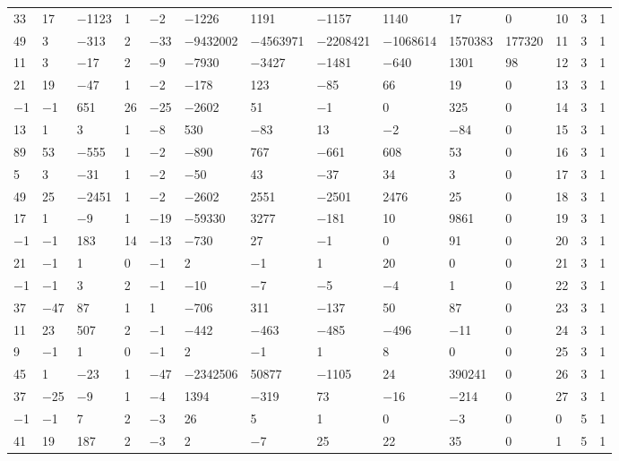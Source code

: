 \documentclass[pdftex]{sigma}
\numberwithin{equation}{section}
\theoremstyle{definition}
\numberwithin{table}{section}
\begin{document}
{\begin{paracol}{3}
\begin{supertabular}{|w{c}{.32cm}w{c}{.32cm}w{c}{.32cm}@{\hspace{.5cm}}w{c}{.2cm}w{c}{.2cm}|@{\hspace{\tabcolsep}}HHHHHHw{c}{.17cm}w{c}{.17cm}w{c}{.17cm}|}
			33 & 17 & $-$1123 & 1 & $-$2 & $-$1226 & 1191 & $-$1157 & 1140 & 17 & 0 & 10 & 3 & 1 \\
			49 & 3 & $-$313 & 2 & $-$33 & $-$9432002 & $-$4563971 & $-$2208421 & $-$1068614 & 1570383 & 177320 & 11 & 3 & 1 \\
			11 & 3 & $-$17 & 2 & $-$9 & $-$7930 & $-$3427 & $-$1481 & $-$640 & 1301 & 98 & 12 & 3 & 1 \\
			21 & 19 & $-$47 & 1 & $-$2 & $-$178 & 123 & $-$85 & 66 & 19 & 0 & 13 & 3 & 1 \\
			$-$1 & $-$1 & 651 & 26 & $-$25 & $-$2602 & 51 & $-$1 & 0 & 325 & 0 & 14 & 3 & 1 \\
			13 & 1 & 3 & 1 & $-$8 & 530 & $-$83 & 13 & $-$2 & $-$84 & 0 & 15 & 3 & 1 \\
			89 & 53 & $-$555 & 1 & $-$2 & $-$890 & 767 & $-$661 & 608 & 53 & 0 & 16 & 3 & 1 \\
			5 & 3 & $-$31 & 1 & $-$2 & $-$50 & 43 & $-$37 & 34 & 3 & 0 & 17 & 3 & 1 \\
			49 & 25 & $-$2451 & 1 & $-$2 & $-$2602 & 2551 & $-$2501 & 2476 & 25 & 0 & 18 & 3 & 1 \\
			17 & 1 & $-$9 & 1 & $-$19 & $-$59330 & 3277 & $-$181 & 10 & 9861 & 0 & 19 & 3 & 1 \\
			$-$1 & $-$1 & 183 & 14 & $-$13 & $-$730 & 27 & $-$1 & 0 & 91 & 0 & 20 & 3 & 1 \\
			21 & $-$1 & 1 & 0 & $-$1 & 2 & $-$1 & 1 & 20 & 0 & 0 & 21 & 3 & 1 \\
			$-$1 & $-$1 & 3 & 2 & $-$1 & $-$10 & $-$7 & $-$5 & $-$4 & 1 & 0 & 22 & 3 & 1 \\
			37 & $-$47 & 87 & 1 & 1 & $-$706 & 311 & $-$137 & 50 & 87 & 0 & 23 & 3 & 1 \\
			11 & 23 & 507 & 2 & $-$1 & $-$442 & $-$463 & $-$485 & $-$496 & $-$11 & 0 & 24 & 3 & 1 \\
			9 & $-$1 & 1 & 0 & $-$1 & 2 & $-$1 & 1 & 8 & 0 & 0 & 25 & 3 & 1 \\
			45 & 1 & $-$23 & 1 & $-$47 & $-$2342506 & 50877 & $-$1105 & 24 & 390241 & 0 & 26 & 3 & 1 \\
			37 & $-$25 & $-$9 & 1 & $-$4 & 1394 & $-$319 & 73 & $-$16 & $-$214 & 0 & 27 & 3 & 1 \\
			$-$1 & $-$1 & 7 & 2 & $-$3 & 26 & 5 & 1 & 0 & $-$3 & 0 & 0 & 5 & 1\\
			41 & 19 & 187 & 2 & $-$3 & 2 & $-$7 & 25 & 22 & 35 & 0 & 1 & 5 & 1 \\

\end{supertabular}
\end{paracol}}
\end{document}
